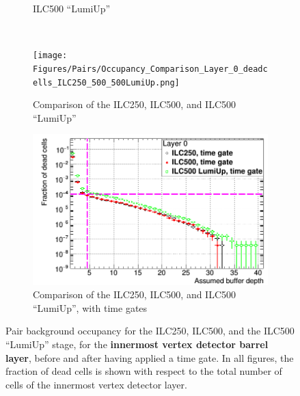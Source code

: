 \begin{figure}
\begin{subfigure}[t]{0.49\textwidth}
   \caption{ILC500 ``LumiUp''}
   \end{subfigure}
      \hfill
   \begin{minipage}{0.49\textwidth}
   \hfill
    \end{minipage}\\
  \begin{subfigure}[t]{0.49\textwidth}
   \centering
    \texttt{[image: Figures/Pairs/Occupancy\_Comparison\_Layer\_0\_deadcells\_ILC250\_500\_500LumiUp.png]}
   \caption{Comparison of the ILC250, ILC500, and ILC500 ``LumiUp''}
   \end{subfigure}
   \hfill
    \begin{subfigure}[t]{0.49\textwidth}
   \centering
    \includegraphics[width=\textwidth]{Figures/Pairs/Occupancy_Comparison_Layer_0_deadcells_ILC250_500_500LumiUp_TimeGate.png}
   \caption{Comparison of the ILC250, ILC500, and ILC500 ``LumiUp'', with time gates}
   \end{subfigure}
   \caption[Pair background occupancy in the \sid vertex detector for the ILC250, ILC500 and the ILC500 ``Lumi Up'' with time gates]{Pair background occupancy for the ILC250, ILC500, and the ILC500 ``LumiUp'' stage, for the \textbf{innermost \sid vertex detector barrel layer}, before and after having applied a time gate.
   In all figures, the fraction of dead cells is shown with respect to the total number of cells of the innermost vertex detector layer.
   }
   \label{fig:PairBkg:Timegate_Occupancy}
 \end{figure}
 
